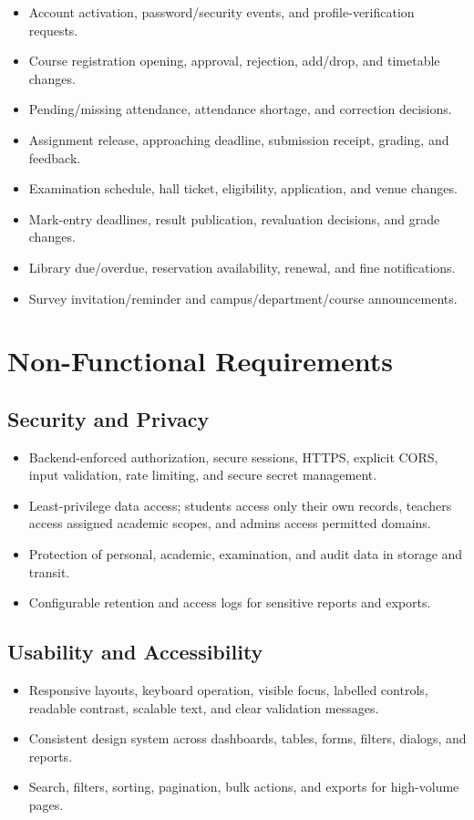 \documentclass[10pt,a4paper]{article}
\begin{document}
\begin{itemize}
  \item Account activation, password/security events, and profile-verification requests.
  \item Course registration opening, approval, rejection, add/drop, and timetable changes.
  \item Pending/missing attendance, attendance shortage, and correction decisions.
  \item Assignment release, approaching deadline, submission receipt, grading, and feedback.
  \item Examination schedule, hall ticket, eligibility, application, and venue changes.
  \item Mark-entry deadlines, result publication, revaluation decisions, and grade changes.
  \item Library due/overdue, reservation availability, renewal, and fine notifications.
  \item Survey invitation/reminder and campus/department/course announcements.
\end{itemize}

\section{Non-Functional Requirements}

\subsection{Security and Privacy}
\begin{itemize}
  \item Backend-enforced authorization, secure sessions, HTTPS, explicit CORS,
        input validation, rate limiting, and secure secret management.
  \item Least-privilege data access; students access only their own records,
        teachers access assigned academic scopes, and admins access permitted domains.
  \item Protection of personal, academic, examination, and audit data in storage and transit.
  \item Configurable retention and access logs for sensitive reports and exports.
\end{itemize}

\subsection{Usability and Accessibility}
\begin{itemize}
  \item Responsive layouts, keyboard operation, visible focus, labelled controls,
        readable contrast, scalable text, and clear validation messages.
  \item Consistent design system across dashboards, tables, forms, filters, dialogs, and reports.
  \item Search, filters, sorting, pagination, bulk actions, and exports for high-volume pages.
\end{itemize}
\end{document}
